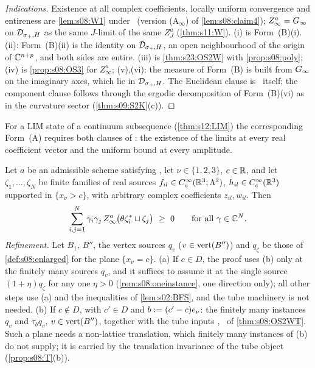 \begin{proof}[Indications]
Existence at all complex coefficients, locally uniform convergence and entireness are \cref{lem:s08:W1} under \Wtwo\ (version (A$_\infty$) of \cref{lem:s08:claim4}); $Z^a_\infty=G_\infty$ on $\mathcal D_{\sigma_+,H}$ as the same $J$-limit of the same $Z^a_J$ (\cref{thm:s11:W}). (i) is Form~(B)(i). (ii): Form~(B)(ii) is the identity on $\mathcal D_{\sigma_+,H}$, an open neighbourhood of the origin of $\mathbb C^{n+p}$, and both sides are entire. (iii) is \cref{thm:s23:OS2W} with \cref{prop:s08:poly}; (iv) is \cref{prop:s08:OS3} for $Z^a_\infty$; (v),(vi): the measure of Form~(B) is built from $G_\infty$ on the imaginary axes, which lie in $\mathcal D_{\sigma_+,H}$. The Euclidean clause is \RW\ itself; the component clause follows through the ergodic decomposition of Form~(B)(vi) as in the curvature sector (\cref{thm:s09:S2K}(c)).
\end{proof}

For a LIM state of a continuum subsequence (\cref{thm:s12:LIM}) the corresponding Form~(A) requires both clauses of \Wtwo: the existence of the limits at every real coefficient vector and the uniform bound at every amplitude.

\begin{theorem}\label{thm:s23:OS2W}
Let $a$ be an admissible scheme satisfying \Wtwo, let $\nu\in\{1,2,3\}$, $c\in\mathbb R$, and let $\zeta_1,\dots,\zeta_N$ be finite families of real sources $f_{il}\in C^\infty_c(\mathbb R^3;\Lambda^2)$, $h_{il}\in C^\infty_c(\mathbb R^3)$ supported in $\{x_\nu>c\}$, with arbitrary complex coefficients $z_{il},w_{il}$. Then
\[
\sum_{i,j=1}^N\bar\gamma_i\gamma_j\,Z^a_\infty\big(\theta\zeta_i^*\sqcup\zeta_j\big)\ \ge\ 0\qquad\text{for all }\gamma\in\C^N .
\]
\emph{Refinement.} Let $B_1$, $B''$, the vertex sources $q_v$ ($v\in\operatorname{vert}(B'')$) and $q_\zeta$ be those of \cref{def:s08:enlarged} for the plane $\{x_\nu=c\}$. (a) If $c\in D$, the proof uses \Wtwo(b) only at the finitely many sources $q_v$, and it suffices to assume it at the single source $(1+\eta)q_\zeta$ for any one $\eta>0$ (\cref{rem:s08:oneinstance}, one direction only); all other steps use \Wtwo(a) and the inequalities of \cref{lem:s02:BFS}, and the tube machinery is not needed. (b) If $c\notin D$, with $c'\in D$ and $b:=(c'-c)e_\nu$: the finitely many instances $q_v$ and $\tau_bq_v$, $v\in\operatorname{vert}(B'')$, together with the tube inputs \Itwo, \Ithree\ of \cref{thm:s08:OS2WT}. Such a plane needs a non-lattice translation, which finitely many instances of \Wtwo(b) do not supply; it is carried by the translation invariance of the tube object (\cref{prop:s08:T}(b)).
\end{theorem}

